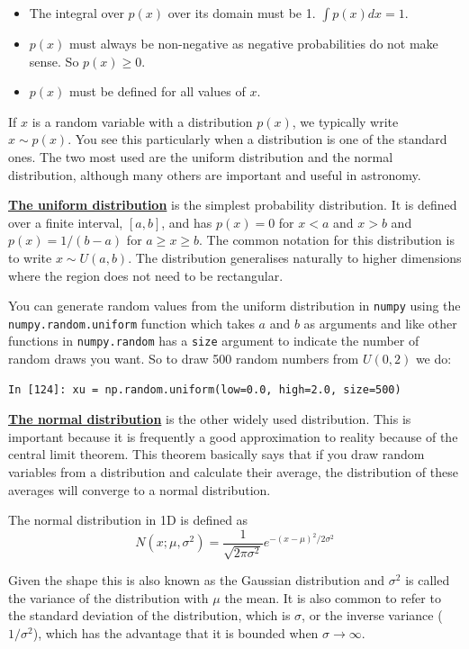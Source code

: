 \documentclass[a4paper,10pt]{article}
\newcommand{\link}[2]{{\color{blue}\href{#1}{#2}}}
\begin{document}
\begin{itemize}
\item The integral over $p(x)$ over its domain must be 1. $\int p(x) dx = 1$.
\item $p(x)$ must always be non-negative as negative probabilities do not make sense. So $p(x)\ge 0$.
\item $p(x)$ must be defined for all values of $x$.
\end{itemize}

If $x$ is a random variable with a distribution $p(x)$, we typically write $x\sim p(x)$. You see this particularly when a distribution is one of the standard ones. The two most used are the uniform distribution and the normal distribution, although many others are important and useful in astronomy. 


\link{https://en.wikipedia.org/wiki/Uniform_distribution_(continuous)}{\textbf{The uniform distribution}} is the simplest probability distribution. It is defined over a finite interval, $[a, b]$, and has $p(x)=0$ for $x<a$ and $x>b$ and $p(x) = 1/(b-a)$ for $a\ge x \ge b$. The common notation for this distribution is to write $x\sim U(a, b)$. The distribution generalises naturally to higher dimensions where the region does not need to be rectangular.

You can generate random values from the uniform distribution in \texttt{numpy} using the \texttt{numpy.random.uniform} function which takes $a$ and $b$ as arguments and like other functions in \texttt{numpy.random} has a \texttt{size} argument to indicate the number of random draws you want. So to draw 500 random numbers from $U(0, 2)$ we do:
\begin{lstlisting}
In [124]: xu = np.random.uniform(low=0.0, high=2.0, size=500)
\end{lstlisting}



\link{https://en.wikipedia.org/wiki/Normal_distribution}{\textbf{The normal distribution}} is the other widely used distribution. This is important because it is frequently a good approximation to reality because of the central limit theorem. This theorem basically says that if you draw random variables from a distribution and calculate their average, the distribution of these averages will converge to a normal distribution.

The normal distribution in 1D is defined as
$$N(x; \mu, \sigma^2)= \frac{1}{\sqrt{2\pi {\sigma^2}}} e^{-(x-\mu)^2/2\sigma^2}$$

Given the shape this is also known as the Gaussian distribution and $\sigma^2$ is called the variance of the distribution with $\mu$ the mean. It is also common to refer to the standard deviation of the distribution, which is $\sigma$, or the inverse variance ($1/\sigma^2$), which has the advantage that it is bounded when $\sigma \to \infty$.
\end{document}
